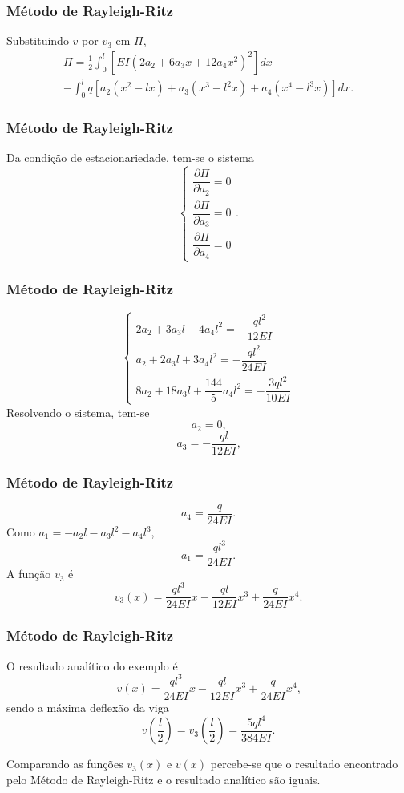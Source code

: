 \documentclass{beamer}
\begin{document}
	\begin{frame}
		\frametitle{Método de Rayleigh-Ritz}
		\justify
		
		Substituindo $v$ por $v_3$ em $\Pi$,
		\begin{multline*}
			\Pi = \frac{1}{2} \int_0^l \left [
				EI(2a_2+6a_3x+12a_4x^2)^2
			\right ] dx
			-
			\\
			-
			\int_0^l q \left [
				a_2(x^2 - lx)
				+
				a_3(x^3 - l^2x)
				+
				a_4(x^4 - l^3x)
			\right ] dx
			\text{.}
		\end{multline*}
	\end{frame}
	
	\begin{frame}
		\frametitle{Método de Rayleigh-Ritz}
		\justify
		Da condição de estacionariedade, tem-se o sistema
		$$
			\begin{cases}
				\dfrac{\partial \Pi}{\partial a_2}=0\\[10pt]
				\dfrac{\partial \Pi}{\partial a_3}=0\\[10pt]
				\dfrac{\partial \Pi}{\partial a_4}=0
			\end{cases}
			\text{.}
		$$
	\end{frame}
	
	\begin{frame}
		\frametitle{Método de Rayleigh-Ritz}
		\justify
		
		$$
			\begin{cases}
				2a_2 + 3a_3l + 4a_4l^2 = -\dfrac{ql^2}{12EI}\\[10pt]
				a_2 + 2a_3 l + 3a_4 l^2 = - \dfrac{ql^2}{24EI}\\[10pt]
				8a_2 + 18a_3 l + \dfrac{144}{5} a_4 l^2 =-\dfrac{3ql^2}{10EI}
			\end{cases}
		$$
		\pause
		Resolvendo o sistema, tem-se
		$$
			a_2 = 0
			\text{,}
		$$
		\pause
		$$
			a_3 = -\frac{ql}{12EI}
			\text{,}
		$$
	\end{frame}
	
	\begin{frame}
		\frametitle{Método de Rayleigh-Ritz}
		\justify
	
		$$
			a_4 = \frac{q}{24EI}
			\text{.}
		$$
		\pause
		Como $a_1=-a_2l - a_3l^2-a_4l^3$,
		$$
			a_1 = \frac{ql^3}{24EI}
			\text{.}
		$$
		\pause
		A função $v_3$ é
		$$
			v_3(x)=
			\frac{ql^3}{24EI} x
			-
			\frac{ql}{12EI} x^3
			+
			\frac{q}{24EI} x^4
			\text{.}
		$$
	\end{frame}
	
	\begin{frame}
		\frametitle{Método de Rayleigh-Ritz}
		\justify
		
		O resultado analítico do exemplo é
		$$
			v(x)=\frac{ql^3}{24EI}x - \frac{ql}{12EI}x^3 + \frac{q}{24EI}x^4
			\text{,}
		$$
		\pause
		sendo a máxima deflexão da viga
		$$
			v\left (\frac{l}{2}\right )
			=
			v_3\left (\frac{l}{2}\right )
			= \frac{5ql^4}{384EI}
			\text{.}
		$$
		\pause
		
		Comparando as funções $v_3(x)$ e $v(x)$ percebe-se que o resultado encontrado pelo Método de Rayleigh-Ritz e o resultado analítico são iguais.
	\end{frame}
	
\end{document}
